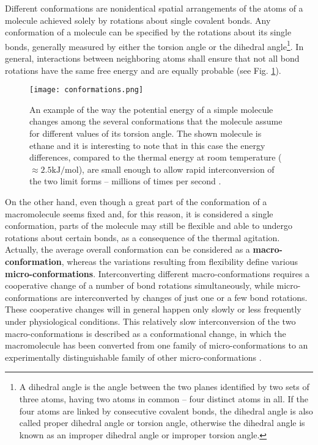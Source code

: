 Different conformations are nonidentical spatial arrangements of the atoms of a molecule achieved solely by rotations about single covalent bonds. %
Any conformation of a molecule %
can be specified by the rotations about its single bonds, generally measured by either the torsion angle or the dihedral angle\footnote{A dihedral angle is the angle between the two planes identified by two sets of three atoms, having two atoms in common -- four distinct atoms in all. If the four atoms are linked by consecutive covalent bonds, the dihedral angle is also called proper dihedral angle or torsion angle, otherwise the dihedral angle is known as an improper dihedral angle or improper torsion angle.}. In general, interactions between neighboring atoms shall ensure that not all bond rotations have the same free energy and are equally probable (see Fig. \ref{fig:EthaneConf}).


\begin{figure}[h]
\centering
\begin{minipage}[t]{0.88\textwidth}
\centering
\texttt{[image: conformations.png]}

\caption{\small{An example of the way the potential energy of a simple molecule changes among the several conformations that the molecule assume for different values of its torsion angle. The shown molecule is ethane and it is interesting to note that in this case the energy differences, compared to the thermal energy at room temperature ($\approx 2.5 \text{kJ}/\text{mol}$), are small enough to allow rapid interconversion of the two limit forms -- millions of times per second
\cite{nelson2008lehninger}.}}

\label{fig:EthaneConf}
\end{minipage} 
\end{figure}



On the other hand, even though a great part of the conformation of a macromolecule seems fixed and, for this reason, it is considered a single conformation, parts of the molecule may still be flexible and able to undergo rotations about certain bonds, as a consequence of the thermal agitation. Actually, the average overall conformation can be considered as a \textbf{macro-conformation}, whereas the variations resulting from flexibility define various \textbf{micro-conformations}. Interconverting different macro-conformations requires a cooperative change of a number of bond rotations simultaneously, while micro-conformations are interconverted by changes of just one or a few bond rotations. These cooperative changes will in general happen only slowly or less frequently under physiological conditions. This relatively slow interconversion of the two macro-conformations is described as a conformational change, in which the macromolecule has been converted from one family of micro-conformations to an experimentally distinguishable family of other micro-conformations
\cite{creighton2010biophysical}.

